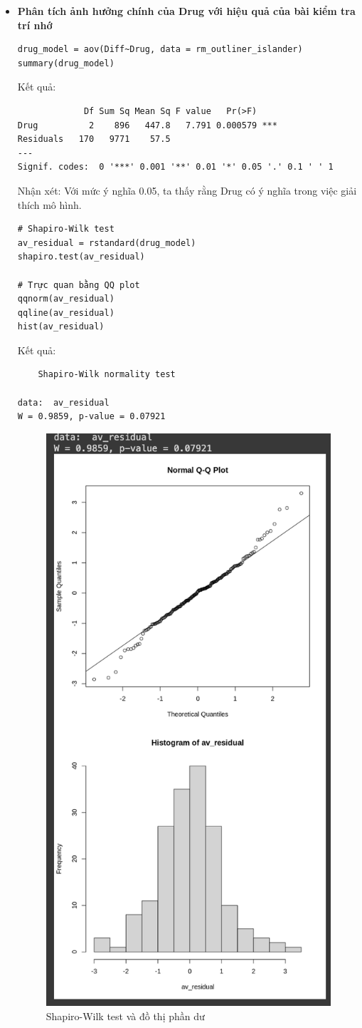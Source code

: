 \begin{itemize}
    \item \textbf{Phân tích ảnh hưởng chính của Drug với hiệu quả của bài kiểm tra trí nhớ}
    \begin{lstlisting}
drug_model = aov(Diff~Drug, data = rm_outliner_islander)
summary(drug_model)
    \end{lstlisting}
    Kết quả:
    \begin{lstlisting}
             Df Sum Sq Mean Sq F value   Pr(>F)    
Drug          2    896   447.8   7.791 0.000579 ***
Residuals   170   9771    57.5                     
---
Signif. codes:  0 '***' 0.001 '**' 0.01 '*' 0.05 '.' 0.1 ' ' 1
    \end{lstlisting}
    Nhận xét: Với mức ý nghĩa 0.05, ta thấy rằng Drug có ý nghĩa trong việc giải thích mô hình.
    \begin{lstlisting}
# Shapiro-Wilk test
av_residual = rstandard(drug_model)
shapiro.test(av_residual)

# Trực quan bằng QQ plot
qqnorm(av_residual)
qqline(av_residual)
hist(av_residual)
    \end{lstlisting}

    Kết quả:
    \begin{lstlisting}
	Shapiro-Wilk normality test

data:  av_residual
W = 0.9859, p-value = 0.07921
    \end{lstlisting}

    \begin{figure}
        \centering
        \includegraphics[width=0.5\linewidth]{part01_figures/38.png}
        \caption{Shapiro-Wilk test và đồ thị phần dư}
        \label{fig:Shapiro-Wilk test và đồ thị phần dư}
    \end{figure}


\end{itemize}
